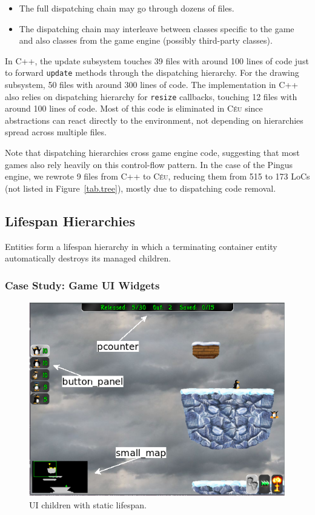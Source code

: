 \documentclass{vgtc}                          %
\newcommand{\CEU}{\textsc{C\'{e}u}\xspace}
\newcommand{\code}[1] {{\small{\texttt{#1}}}}
\begin{document}
\begin{itemize}
\item The full dispatching chain may go through dozens of files.
\item The dispatching chain may interleave between classes specific to the game
      and also classes from the game engine (possibly third-party classes).
\end{itemize}

In C++, the update subsystem touches 39 files with around 100 lines of code
just to forward \code{update} methods through the dispatching hierarchy.
For the drawing subsystem, 50 files with around 300 lines of code.
The implementation in C++ also relies on dispatching hierarchy for
\code{resize} callbacks, touching 12 files with around 100 lines of code.
%
Most of this code is eliminated in \CEU since abstractions can react directly
to the environment, not depending on hierarchies spread across multiple files.

Note that dispatching hierarchies cross game engine code, suggesting that most
games also rely heavily on this control-flow pattern.
In the case of the Pingus engine, we rewrote 9 files from C++ to \CEU, reducing
them from 515 to 173 LoCs (not listed in Figure~\ref{tab.tree}), mostly due to
dispatching code removal.

\subsection{Lifespan Hierarchies}
\label{sec.pats.lifespan}

    Entities form a lifespan hierarchy in which a terminating container entity
    automatically destroys its managed children.

\subsubsection{Case Study: Game UI Widgets}

\begin{figure}[t]
\centering
\includegraphics[width=\columnwidth]{game-session-arrows}
\caption{UI children with static lifespan.
\label{fig.ui}
}
\end{figure}
\end{document}
